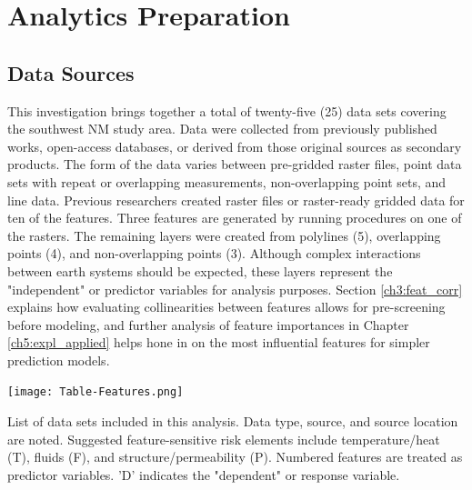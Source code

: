 \chapter{Analytics Preparation}\label{ch3:expl_prep}

\section{Data Sources}\label{ch3:expl_data_src}

This investigation brings together a total of twenty-five (25) data sets covering the southwest NM study area. Data were collected from previously published works, open-access databases, or derived from those original sources as secondary products. The form of the data varies between pre-gridded raster files, point data sets with repeat or overlapping measurements, non-overlapping point sets, and line data. Previous researchers created raster files or raster-ready gridded data for ten of the features. Three features are generated by running procedures on one of the rasters. The remaining layers were created from polylines (5), overlapping points (4), and non-overlapping points (3). Although complex interactions between earth systems should be expected, these layers represent the "independent" or predictor variables for analysis purposes. Section \ref{ch3:feat_corr} explains how evaluating collinearities between features allows for pre-screening before modeling, and further analysis of feature importances in Chapter \ref{ch5:expl_applied} helps hone in on the most influential features for simpler prediction models.

\begin{table}[htp]
\centering
\texttt{[image: Table-Features.png]}
\caption[Southwestern New Mexico features list]{List of data sets included in this analysis. Data type, source, and source location are noted. Suggested feature-sensitive risk elements include temperature/heat (T), fluids (F), and structure/permeability (P). Numbered features are treated as predictor variables. 'D' indicates the "dependent" or response variable.}
\label{tab:features}
\end{table}

